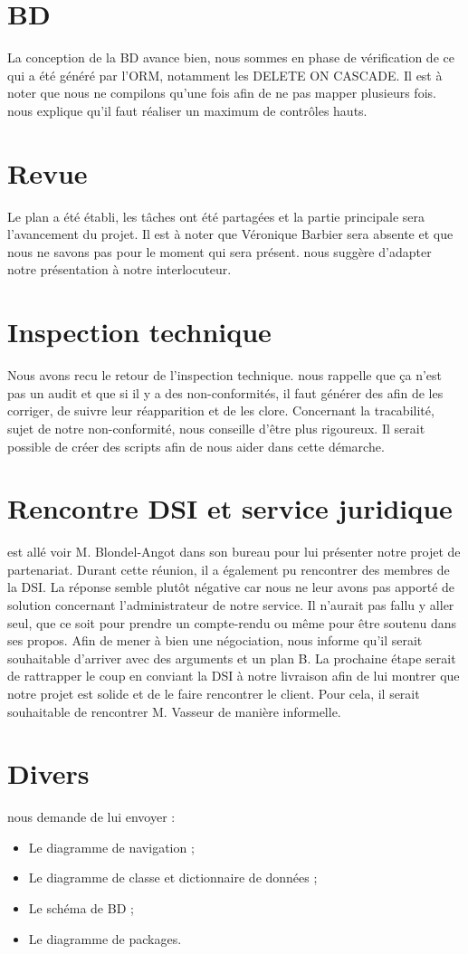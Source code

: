 \documentclass [a4paper] {article}
\begin{document}
\section{BD}
La conception de la BD avance bien, nous sommes en phase de vérification de ce qui a été généré par l'ORM, notamment les DELETE ON CASCADE. Il est à noter que nous ne compilons qu'une fois afin de ne pas mapper plusieurs fois. \nomTuteurPedago{} nous explique qu'il faut réaliser un maximum de contrôles hauts.

\section{Revue}
Le plan a été établi, les tâches ont été partagées et la partie principale sera l'avancement du projet. Il est à noter que Véronique Barbier sera absente et que nous ne savons pas pour le moment qui sera présent. \nomTuteurPedago{} nous suggère d'adapter notre présentation à notre interlocuteur.

\section{Inspection technique}
Nous avons recu le retour de l'inspection technique. \nomTuteurPedago{} nous rappelle que ça n'est pas un audit et que si il y a des non-conformités, il faut générer des \FT{} afin de les corriger, de suivre leur réapparition et de les clore.
Concernant la tracabilité, sujet de notre non-conformité, \nomTuteurPedago{} nous conseille d'être plus rigoureux. Il serait possible de créer des scripts afin de nous aider dans cette démarche.


\section{Rencontre DSI et service juridique}
\Sergi{} est allé voir M. Blondel-Angot dans son bureau pour lui présenter notre projet de partenariat. Durant cette réunion, il a également pu rencontrer des membres de la DSI. La réponse semble plutôt négative car nous ne leur avons pas apporté de solution concernant l'administrateur de notre service. Il n'aurait pas fallu y aller seul, que ce soit pour prendre un compte-rendu ou même pour être soutenu dans ses propos. Afin de mener à bien une négociation, \nomTuteurPedago{} nous informe qu'il serait souhaitable d'arriver avec des arguments et un plan B. La prochaine étape serait de rattrapper le coup en conviant la DSI à notre livraison afin de lui montrer que notre projet  est solide et de le faire rencontrer le client. Pour cela, il serait souhaitable de rencontrer M. Vasseur de manière informelle.


\section{Divers}
\nomTuteurPedago{} nous demande de lui envoyer : 
\begin{itemize}
\item Le diagramme de navigation ;
\item Le diagramme de classe et dictionnaire de données ;
\item Le schéma de BD ;
\item Le diagramme de packages.
\end{itemize}



\newpage
\end{document}
